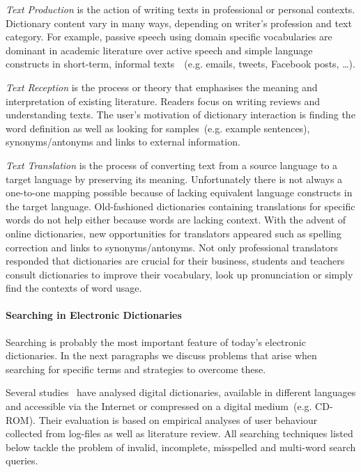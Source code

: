 \documentclass[draft,final]{vutinfth} %
\begin{document}
\textit{Text Production} is the action of writing texts in professional or personal contexts. Dictionary content vary in many ways, depending on writer's profession and text category. For example, passive speech using domain specific vocabularies are dominant in academic literature over active speech and simple language constructs in short-term, informal texts~\cite{o2010routledge}~(e.g. emails, tweets, Facebook posts, \ldots).

\textit{Text Reception} is the process or theory that emphasises the meaning and interpretation of existing literature. Readers focus on writing reviews and understanding texts. The user's motivation of dictionary interaction is finding the word definition as well as looking for samples~(e.g. example sentences), synonyms/antonyms and links to external information. 

\textit{Text Translation} is the process of converting text from a source language to a target language by preserving its meaning. Unfortunately there is not always a one-to-one mapping possible because of lacking equivalent language constructs in the target language. Old-fashioned dictionaries containing translations for specific words do not help either because words are lacking context. With the advent of online dictionaries, new opportunities for translators appeared such as spelling correction and links to synonyms/antonyms. Not only professional translators responded that dictionaries are crucial for their business, students and teachers consult dictionaries to improve their vocabulary, look up pronunciation or simply find the contexts of word usage. 

\paragraph{Searching in Electronic Dictionaries} Searching is probably the most important feature of today's electronic dictionaries. In the next paragraphs we discuss problems that arise when searching for specific terms and strategies to overcome these. 

Several studies~\cite{pastor2010, mvechura2008} have analysed digital dictionaries, available in different languages and accessible via the Internet or compressed on a digital medium~(e.g. CD-ROM). Their evaluation is based on empirical analyses of user behaviour collected from log-files as well as literature review. All searching techniques listed below tackle the problem of invalid, incomplete, misspelled and multi-word search queries.
\end{document}

